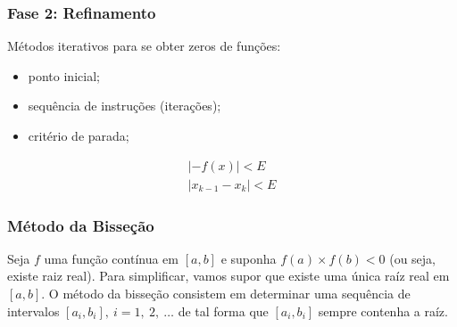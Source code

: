 \documentclass{article}
\begin{document}
        \subsubsection*{Fase 2: Refinamento}
        Métodos iterativos para se obter zeros de funções:
        \begin{itemize}
            \item ponto inicial;
            \item sequência de instruções (iterações);
            \item critério de parada;
        \end{itemize}

        \begin{gather*}
            |-f(x)| < E\\
            |x_{k-1} - x_k| < E
        \end{gather*}

        \subsubsection*{Método da Bisseção}
        Seja $f$ uma função contínua em $[a,b]$ e suponha $f(a) \times f(b) < 0$ (ou seja, existe raiz real). Para simplificar, vamos supor que existe uma única raíz real em $[a,b]$. O método da bisseção consistem em determinar uma sequência de intervalos $[a_i,b_i],~i = 1,~2,~\ldots$ de tal forma que $[a_i,b_i]$ sempre contenha a raíz.
\end{document}
